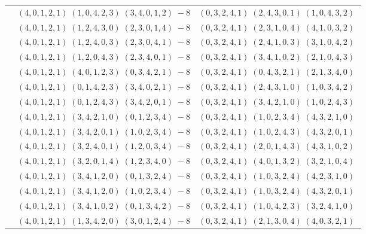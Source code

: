 \documentclass[11pt]{article}
\begin{document}
\begin{longtable}[l]{|c|c|c|}
 \cline{2-3} 
 & $(4 ,0 ,1 ,2 ,1) \;(1 ,0 ,4 ,2 ,3) \;(3 ,4 ,0 ,1 ,2) \;-8$ & $(0 ,3 ,2 ,4 ,1) \;(2 ,4 ,3 ,0 ,1) \;(1 ,0 ,4 ,3 ,2) \;$\\ 
 \cline{2-3} 
 & $(4 ,0 ,1 ,2 ,1) \;(1 ,2 ,4 ,3 ,0) \;(2 ,3 ,0 ,1 ,4) \;-8$ & $(0 ,3 ,2 ,4 ,1) \;(2 ,3 ,1 ,0 ,4) \;(4 ,1 ,0 ,3 ,2) \;$\\ 
 \cline{2-3} 
 & $(4 ,0 ,1 ,2 ,1) \;(1 ,2 ,4 ,0 ,3) \;(2 ,3 ,0 ,4 ,1) \;-8$ & $(0 ,3 ,2 ,4 ,1) \;(2 ,4 ,1 ,0 ,3) \;(3 ,1 ,0 ,4 ,2) \;$\\ 
 \cline{2-3} 
 & $(4 ,0 ,1 ,2 ,1) \;(1 ,2 ,0 ,4 ,3) \;(2 ,3 ,4 ,0 ,1) \;-8$ & $(0 ,3 ,2 ,4 ,1) \;(3 ,4 ,1 ,0 ,2) \;(2 ,1 ,0 ,4 ,3) \;$\\ 
 \cline{2-3} 
 & $(4 ,0 ,1 ,2 ,1) \;(4 ,0 ,1 ,2 ,3) \;(0 ,3 ,4 ,2 ,1) \;-8$ & $(0 ,3 ,2 ,4 ,1) \;(0 ,4 ,3 ,2 ,1) \;(2 ,1 ,3 ,4 ,0) \;$\\ 
 \cline{2-3} 
 & $(4 ,0 ,1 ,2 ,1) \;(0 ,1 ,4 ,2 ,3) \;(3 ,4 ,0 ,2 ,1) \;-8$ & $(0 ,3 ,2 ,4 ,1) \;(2 ,4 ,3 ,1 ,0) \;(1 ,0 ,3 ,4 ,2) \;$\\ 
 \cline{2-3} 
 & $(4 ,0 ,1 ,2 ,1) \;(0 ,1 ,2 ,4 ,3) \;(3 ,4 ,2 ,0 ,1) \;-8$ & $(0 ,3 ,2 ,4 ,1) \;(3 ,4 ,2 ,1 ,0) \;(1 ,0 ,2 ,4 ,3) \;$\\ 
 \cline{2-3} 
 & $(4 ,0 ,1 ,2 ,1) \;(3 ,4 ,2 ,1 ,0) \;(0 ,1 ,2 ,3 ,4) \;-8$ & $(0 ,3 ,2 ,4 ,1) \;(1 ,0 ,2 ,3 ,4) \;(4 ,3 ,2 ,1 ,0) \;$\\ 
 \cline{2-3} 
 & $(4 ,0 ,1 ,2 ,1) \;(3 ,4 ,2 ,0 ,1) \;(1 ,0 ,2 ,3 ,4) \;-8$ & $(0 ,3 ,2 ,4 ,1) \;(1 ,0 ,2 ,4 ,3) \;(4 ,3 ,2 ,0 ,1) \;$\\ 
 \cline{2-3} 
 & $(4 ,0 ,1 ,2 ,1) \;(3 ,2 ,4 ,0 ,1) \;(1 ,2 ,0 ,3 ,4) \;-8$ & $(0 ,3 ,2 ,4 ,1) \;(2 ,0 ,1 ,4 ,3) \;(4 ,3 ,1 ,0 ,2) \;$\\ 
 \cline{2-3} 
 & $(4 ,0 ,1 ,2 ,1) \;(3 ,2 ,0 ,1 ,4) \;(1 ,2 ,3 ,4 ,0) \;-8$ & $(0 ,3 ,2 ,4 ,1) \;(4 ,0 ,1 ,3 ,2) \;(3 ,2 ,1 ,0 ,4) \;$\\ 
 \cline{2-3} 
 & $(4 ,0 ,1 ,2 ,1) \;(3 ,4 ,1 ,2 ,0) \;(0 ,1 ,3 ,2 ,4) \;-8$ & $(0 ,3 ,2 ,4 ,1) \;(1 ,0 ,3 ,2 ,4) \;(4 ,2 ,3 ,1 ,0) \;$\\ 
 \cline{2-3} 
 & $(4 ,0 ,1 ,2 ,1) \;(3 ,4 ,1 ,2 ,0) \;(1 ,0 ,2 ,3 ,4) \;-8$ & $(0 ,3 ,2 ,4 ,1) \;(1 ,0 ,3 ,2 ,4) \;(4 ,3 ,2 ,0 ,1) \;$\\ 
 \cline{2-3} 
 & $(4 ,0 ,1 ,2 ,1) \;(3 ,4 ,1 ,0 ,2) \;(0 ,1 ,3 ,4 ,2) \;-8$ & $(0 ,3 ,2 ,4 ,1) \;(1 ,0 ,4 ,2 ,3) \;(3 ,2 ,4 ,1 ,0) \;$\\ 
 \cline{2-3} 
 & $(4 ,0 ,1 ,2 ,1) \;(1 ,3 ,4 ,2 ,0) \;(3 ,0 ,1 ,2 ,4) \;-8$ & $(0 ,3 ,2 ,4 ,1) \;(2 ,1 ,3 ,0 ,4) \;(4 ,0 ,3 ,2 ,1) \;$\\ 

\end{longtable}
\end{document}

